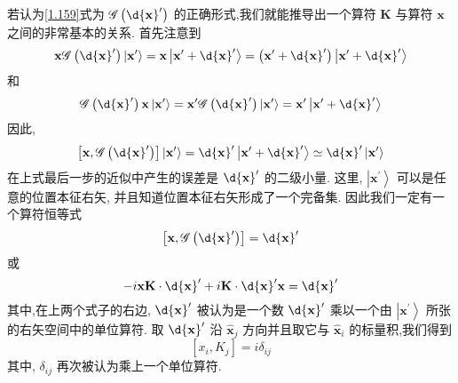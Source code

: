 	若认为\ref{1.159}式为 $\mathscr{G}\left( {\d{\mathbf{x}}^{\prime }}\right)$ 的正确形式,我们就能推导出一个算符 $\mathbf{K}$ 与算符 $\mathbf{x}$ 之间的非常基本的关系. 首先注意到
	\begin{equation}
		\mathbf{x}\mathscr{G}\left( {\d{\mathbf{x}}^{\prime }}\right) \left| {\mathbf{x}}^{\prime }\right\rangle = \mathbf{x}\left| {{\mathbf{x}}^{\prime } + \d{\mathbf{x}}^{\prime }}\right\rangle = \left( {{\mathbf{x}}^{\prime } + \d{\mathbf{x}}^{\prime }}\right) \left| {{\mathbf{x}}^{\prime } + \d{\mathbf{x}}^{\prime }}\right\rangle
	\end{equation}
	和
	\begin{equation}
		\mathscr{G}\left( {\d{\mathbf{x}}^{\prime }}\right) \mathbf{x}\left| {\mathbf{x}}^{\prime }\right\rangle = {\mathbf{x}}^{\prime }\mathscr{G}\left( {\d{\mathbf{x}}^{\prime }}\right) \left| {\mathbf{x}}^{\prime }\right\rangle = {\mathbf{x}}^{\prime }\left| {{\mathbf{x}}^{\prime } + \d{\mathbf{x}}^{\prime }}\right\rangle
	\end{equation}
	因此,
	\begin{equation}
		\left\lbrack {\mathbf{x},\mathscr{G}\left( {\d{\mathbf{x}}^{\prime }}\right) }\right\rbrack \left| {\mathbf{x}}^{\prime }\right\rangle = \d{\mathbf{x}}^{\prime }\left| {{\mathbf{x}}^{\prime } + \d{\mathbf{x}}^{\prime }}\right\rangle \simeq \d{\mathbf{x}}^{\prime }\left| {\mathbf{x}}^{\prime }\right\rangle
	\end{equation}
	在上式最后一步的近似中产生的误差是 $\d{\mathbf{x}}^{\prime }$ 的二级小量. 这里, $\left| {\mathbf{x}}^{\prime }\right\rangle$ 可以是任意的位置本征右矢, 并且知道位置本征右矢形成了一个完备集. 因此我们一定有一个算符恒等式
	\begin{equation}
		\left\lbrack {\mathbf{x}, \mathscr{G}\left( {\d{\mathbf{x}}^{\prime }}\right) }\right\rbrack = \d{\mathbf{x}}^{\prime }
	\end{equation}
	或
	\begin{equation}
		- i\mathbf{x}\mathbf{K} \cdot \d{\mathbf{x}}^{\prime } + i\mathbf{K} \cdot \d{\mathbf{x}}^{\prime }\mathbf{x} = \d{\mathbf{x}}^{\prime }
	\end{equation}
	其中,在上两个式子的右边, $\d{\mathbf{x}}^{\prime }$ 被认为是一个数 $\d{\mathbf{x}}^{\prime }$ 乘以一个由 $\left| {\mathbf{x}}^{\prime }\right\rangle$ 所张的右矢空间中的单位算符. 取 $\d{\mathbf{x}}^{\prime }$ 沿 ${\widehat{\mathbf{x}}}_{j}$ 方向并且取它与 ${\widehat{\mathbf{x}}}_{i}$ 的标量积,我们得到
	\begin{equation}
		\left\lbrack {{x}_{i},{K}_{j}}\right\rbrack = i{\delta }_{ij}
	\end{equation}
	其中, ${\delta }_{ij}$ 再次被认为乘上一个单位算符.
